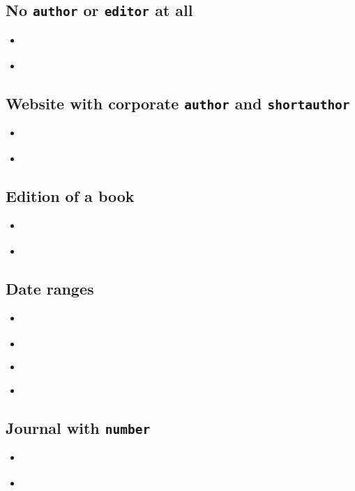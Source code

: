 \documentclass[a4paper,12pt]{scrartcl}
\newcommand{\Feld}[1]{\texttt{#1}}
\begin{document}
\subsection{No \Feld{author} or \Feld{editor} at all}
\begin{itemize}
    \item\cite{domino:1780}%
    \item{}%
\end{itemize}

\subsection{Website with corporate \Feld{author} and \Feld{shortauthor}}
\begin{itemize}
    \item\cite{kenmore}%
    \item{}%
\end{itemize}

\subsection{Edition of a book}
\begin{itemize}
    \item\cite{fuchs:kh:et:al:1998}%
    \item{}%
\end{itemize}

\subsection{Date ranges}
\begin{itemize}
    \item\cite{bhattacharyya:1973}%
    \item{}%
    \item\cite{cossel:1933-35}%
    \item{}%
\end{itemize}

\subsection{Journal with \Feld{number}}
\begin{itemize}
    \item\cite{ib:domino:europa}%
    \item{}%
\end{itemize}
\end{document}
